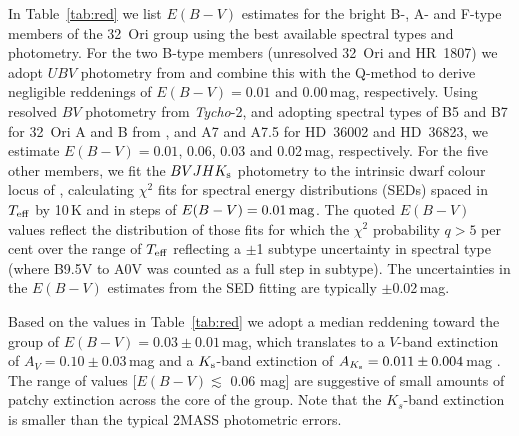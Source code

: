 \documentclass[usenatbib]{mnras}
\begin{document}
In Table~\ref{tab:red} we list $E(B-V)$ estimates for the
bright B-, A- and F-type members of the 32~Ori group using the best
available spectral types and photometry. For the two B-type members
(unresolved 32~Ori and HR~1807) we adopt $UBV$ photometry 
from \cite{Mermilliod06} and combine this with the
Q-method \citep{Pecaut13} to derive negligible reddenings of
$E(B-V)=0.01$ and 0.00\,mag, respectively. Using resolved $BV$
photometry from \emph{Tycho}-2, and adopting spectral types of B5 and B7
for 32~Ori A and B from \cite{Edwards76}, and A7 and A7.5 for
HD~36002 and HD~36823, we estimate $E(B-V)=0.01$, 0.06, 0.03 and
0.02\,mag, respectively. For the five other members, we fit the
$BVJHK_{\rm{s}}$ photometry \citep[and for HR\,1807, $U$-band
  from][]{Johnson66} to the intrinsic dwarf colour locus of
\citet{Pecaut13}, calculating $\chi^2$ fits for spectral energy distributions (SEDs) spaced in
$T_{\rm{eff}}$ by 10\,K and in steps of $E(B-V)=0.01\,\rm{mag}$. The
quoted $E(B-V)$ values reflect the distribution of those fits for
which the $\chi^2$ probability $q>5$ per cent over the range of
$T_{\rm{eff}}$ reflecting a $\pm$1 subtype uncertainty in spectral
type (where B9.5V to A0V was counted as a full step in subtype). The
uncertainties in the $E(B-V)$ estimates from the SED fitting are
typically $\pm$0.02\,mag.

Based on the values in Table~\ref{tab:red} we adopt a median reddening
toward the group of $E(B-V)=0.03\pm0.01$\,mag, which translates to a
$V$-band extinction of $A_{V}=0.10\pm0.03$\,mag and a
$K_{\rm{s}}$-band extinction of $A_{K_{\rm{s}}}=0.011\pm0.004$\,mag
\citep[following][]{Bilir08}.  The range of values [$E(B-V) \lesssim$
  0.06 mag] are suggestive of small amounts of patchy extinction
across the core of the group. Note that the $K_s$-band extinction is
smaller than the typical 2MASS photometric errors.
\end{document}

